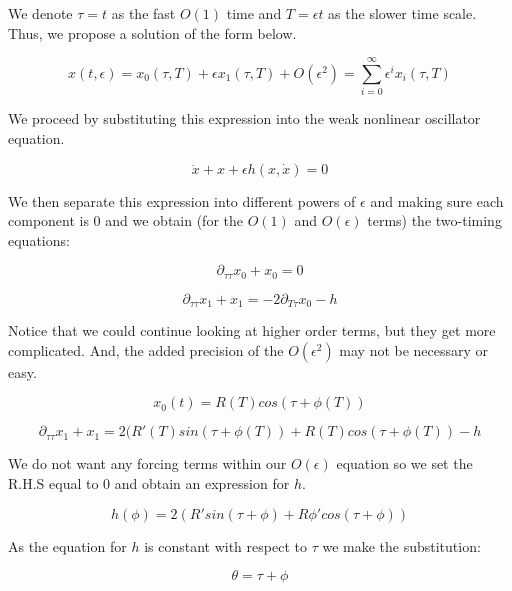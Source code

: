 \documentclass[12pt]{article}
\begin{document}
We denote $\tau = t$ as the fast $O(1)$ time and $T = \epsilon t$ as the slower time scale.  Thus, we propose a solution of the form below.


\begin{equation}
x(t, \epsilon) = x_0(\tau, T) + \epsilon x_1(\tau, T) + O(\epsilon^2) = \sum_{i=0}^{\infty} \epsilon^i x_i(\tau, T)
\end{equation}

We proceed by substituting this expression into the weak nonlinear oscillator equation.

\begin{equation}
\ddot{x} + x + \epsilon h(x, \dot{x}) = 0
\end{equation}

We then separate this expression into different powers of $\epsilon$ and making sure each component is 0 and we obtain (for the $O(1)$ and $O(\epsilon)$ terms) the two-timing equations:

\begin{equation}
\partial_{\tau \tau} x_0  + x_0 = 0
\end{equation}

\begin{equation}
\partial_{\tau \tau} x_1 + x_1 = -2\partial_{T \tau} x_0 -h
\end{equation}


Notice that we could continue looking at higher order terms, but they get more complicated.  And, the added precision of the $O(\epsilon^2)$ may not be necessary or easy.

\begin{equation}
x_0(t) = R(T) cos(\tau + \phi(T))
\end{equation}

\begin{equation}
\partial_{\tau \tau} x_1 + x_1  = 2(R'(T)sin(\tau + \phi(T)) + R(T)cos(\tau + \phi(T)) -h
\end{equation}

We do not want any forcing terms within our $O(\epsilon)$ equation so we set the R.H.S equal to 0 and obtain an expression for $h$.

\begin{equation}
h(\phi) = 2(R'sin(\tau + \phi) + R \phi' cos(\tau + \phi))
\end{equation}

As the equation for $h$ is constant with respect to $\tau$ we make the substitution:

\begin{equation}
\theta = \tau + \phi
\end{equation}
\end{document}
